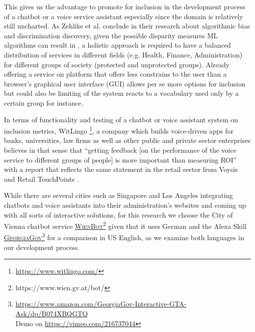 This gives us the advantage to promote for inclusion in the development process of a chatbot or a voice service assistant especially since the domain is relatively still uncharted. As Zehlike et al. conclude in their research about algorithmic bias and discrimination discovery, given the possible disparity measures ML algorithms can result in \cite{fa:ir}, a holistic approach is required to have a balanced distribution of services in different fields (e.g. Health, Finance, Administration) for different groups of society (protected and unprotected groups).
Already offering a service on platform that offers less constrains to the user than a browser's graphical user interface (GUI) allows per se more options for inclusion but could also be limiting of the system reacts to a vocabulary used only by a certain group for instance.

In terms of functionality and testing of a chatbot or voice assistant system on inclusion metrics, WitLingo \footnote{\url{https://www.witlingo.com/}}, a company which builds voice-driven apps for banks, universities, law firms as well as other public and private sector enterprises believes in that sense that ``getting feedback [on the performance of the voice service to different groups of people] is more important than measuring ROI'' \cite{witlingo:bouzid} with a report that reflects the same statement in the retail sector from Voysis and Retail TouchPoints \cite{voysis:report}.



%


	While there are several cities such as Singapore and Los Angeles integrating chatbots and voice assistants into their administration's websites and coming up with all sorts of interactive solutions,
	for this research we choose the City of Vienna chatbot service \href{https://www.wien.gv.at/bot/}{\textsc{WienBot}\footnote{\url{https://www.wien.gv.at/bot/}}} given that it uses German 
	and the Alexa Skill \href{https://www.amazon.com/GeorgiaGov-Interactive-GTA-Ask/dp/B074XBQGTQ}{\textsc{GeorgiaGov}}\footnote{\url{https://www.amazon.com/GeorgiaGov-Interactive-GTA-Ask/dp/B074XBQGTQ}\\ Demo on \url{https://vimeo.com/216737044}} for a comparison in US English, as we examine both languages in our development process.

